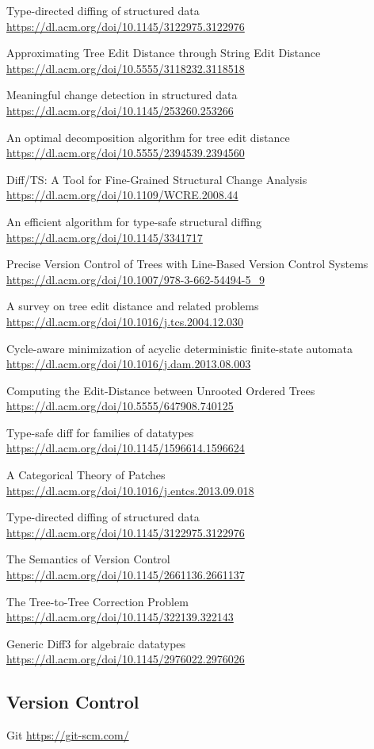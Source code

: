 Type-directed diffing of structured data \url{https://dl.acm.org/doi/10.1145/3122975.3122976}

  Approximating Tree Edit Distance through String Edit Distance \url{https://dl.acm.org/doi/10.5555/3118232.3118518}

  Meaningful change detection in structured data \url{https://dl.acm.org/doi/10.1145/253260.253266}

  An optimal decomposition algorithm for tree edit distance \url{https://dl.acm.org/doi/10.5555/2394539.2394560}

  Diff/TS: A Tool for Fine-Grained Structural Change Analysis \url{https://dl.acm.org/doi/10.1109/WCRE.2008.44}

An efficient algorithm for type-safe structural diffing \url{https://dl.acm.org/doi/10.1145/3341717}

  Precise Version Control of Trees with Line-Based Version Control Systems \url{https://dl.acm.org/doi/10.1007/978-3-662-54494-5_9}

  A survey on tree edit distance and related problems \url{https://dl.acm.org/doi/10.1016/j.tcs.2004.12.030}

  Cycle-aware minimization of acyclic deterministic finite-state automata \url{https://dl.acm.org/doi/10.1016/j.dam.2013.08.003}

  Computing the Edit-Distance between Unrooted Ordered Trees \url{https://dl.acm.org/doi/10.5555/647908.740125}

  Type-safe diff for families of datatypes \url{https://dl.acm.org/doi/10.1145/1596614.1596624}

  A Categorical Theory of Patches \url{https://dl.acm.org/doi/10.1016/j.entcs.2013.09.018}

  Type-directed diffing of structured data \url{https://dl.acm.org/doi/10.1145/3122975.3122976}

  The Semantics of Version Control \url{https://dl.acm.org/doi/10.1145/2661136.2661137}

  The Tree-to-Tree Correction Problem \url{https://dl.acm.org/doi/10.1145/322139.322143}

  Generic Diff3 for algebraic datatypes \url{https://dl.acm.org/doi/10.1145/2976022.2976026}

\subsection{Version Control}

Git \url{https://git-scm.com/}

